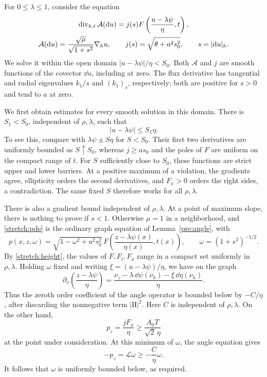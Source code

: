 For $0\le\lambda\le1$, consider the equation
\begin{equation}\label{stretch:pde}
 \begin{gathered}
 \operatorname{div}_{h,t}\mathcal A(\mathrm d u)
     =j(s)F\left(\frac{u-\lambda\psi}{\eta},t\right),\\
 \mathcal A(\mathrm d u)=\frac{\sqrt\mu}{\sqrt{1+s^2}}\nabla_hu,
 \qquad j(s)=\sqrt{\theta+a^2s_0^2},
 \qquad s=|\mathrm d u|_h.
 \end{gathered}
\end{equation}
We solve it within the open domain
$|u-\lambda\psi|/\eta<S_0$.  Both $\mathcal A$ and $j$ are smooth
functions of the covector $\dd u$, including at zero.  The flux derivative
has tangential and radial eigenvalues $k_1/s$ and $(k_1)_s$, respectively;
both are positive for $s>0$ and tend to $a$ at zero.

We first obtain estimates for every smooth solution in this domain.
There is $S_1<S_0$, independent of $\rho,\lambda$, such that
\begin{equation}\label{stretch:height}
 |u-\lambda\psi|\le S_1\eta.
\end{equation}
To see this, compare with $\lambda\psi\pm S\eta$ for $S<S_0$.
Their first two derivatives are uniformly bounded as $S\uparrow S_0$,
whereas $j\ge as_0$ and the poles of $F$ are uniform on the compact range
of $t$.  For $S$ sufficiently close to $S_0$, these functions are strict
upper and lower barriers.  At a positive maximum of a violation, the
gradients agree, ellipticity orders the second derivatives, and $F_x>0$
orders the right sides, a contradiction.  The same fixed $S$ therefore
works for all $\rho,\lambda$.

There is also a gradient bound independent of $\rho,\lambda$.  At a point
of maximum slope, there is nothing to prove if $s<1$.  Otherwise $\mu=1$
in a neighborhood, and \eqref{stretch:pde} is the ordinary graph equation
of Lemma~\ref{pre:angle}, with
\[
 p(x,z,\omega)=\sqrt{1-\omega^2+a^2s_0^2}\,
 F\left(\frac{z-\lambda\psi(x)}{\eta(x)},t(x)\right),
 \qquad \omega=(1+s^2)^{-1/2}.
\]
By \eqref{stretch:height}, the values of $F,F_t,F_x$ range in a compact
set uniformly in $\rho,\lambda$.  Holding $\omega$ fixed and writing
$\xi=(u-\lambda\psi)/\eta$, we have on the graph
\[
 \partial_\nu\left(\frac{z-\lambda\psi}{\eta}\right)
 =\frac{\nu_z-\lambda\,\dd\psi(\nu_h)
                         -\xi\,\dd\eta(\nu_h)}{\eta}.
\]
Thus the zeroth order coefficient of the angle operator is bounded below
by $-C/\eta$, after discarding the nonnegative term $|\mathrm{II}|^2$.
Here $C$ is independent of $\rho,\lambda$.  On the other hand,
\[
 p_z=\frac{jF_x}{\eta}\ge\frac{A_0T}{\sqrt2\,\eta}
\]
at the point under consideration.  At this minimum of $\omega$, the
angle equation gives
\[
 -p_z=\mathcal L\omega\ge-\frac{C}{\eta}\omega.
\]
It follows that $\omega$ is uniformly bounded below, as required.


